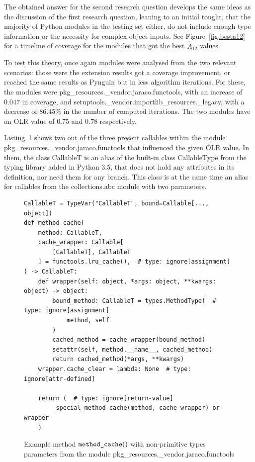 \documentclass[%
  chapterprefix=false,%
  open=right,%
  twoside=true,%
  paper=a4,%
  logofile={Figures/logo.png},%
  thesistype=master,%
  UKenglish,%
]{se2thesis}
\newcommand{\callable}[2][]{\(\text{\texttt{#2}}(#1)\)}
\begin{document}
The obtained answer for the second research question develops the same ideas as the discussion of the first research question, leaning to an initial tought, that the majority of Python modules in the testing set either, do not include enough type information or the necessity for complex object inputs. 
See Figure~\ref{fig:besta12} for a timeline of coverage for the modules that got the best \(\hat{A}_{12}\) values.

To test this theory, once again modules were analysed from the two relevant scenarios: those were the extension results got a coverage improvement, or reached the same results as Pynguin but in less algorithm iterations.
For these, the modules were pkg\_resources.\_vendor.jaraco.functools, with an increase of \(0.047\) in coverage, and setuptools.\_vendor.importlib\_resources.\_legacy, with a decrease of \(86.45\%\) in the number of computed iterations.
The two modules have an OLR value of \(0.75\) and \(0.78\) respectively.

Listing~\ref{lst:10} shows two out of the three present callables within the module pkg\_resources.\_vendor.jaraco.functools that influenced the given OLR value.
In them, the class CallableT is an alias of the built-in class CallableType from the typing library added in Python 3.5, that does not hold any attributes in its definition, nor need them for any branch.
This class is at the same time an alias for callables from the collections.abc module with two parameters. 

\begin{figure}
\begin{verbatim}
CallableT = TypeVar("CallableT", bound=Callable[..., object])
def method_cache(
    method: CallableT,
    cache_wrapper: Callable[
        [CallableT], CallableT
    ] = functools.lru_cache(),  # type: ignore[assignment]
) -> CallableT:
    def wrapper(self: object, *args: object, **kwargs: object) -> object:
        bound_method: CallableT = types.MethodType(  # type: ignore[assignment]
            method, self
        )
        cached_method = cache_wrapper(bound_method)
        setattr(self, method.__name__, cached_method)
        return cached_method(*args, **kwargs)
    wrapper.cache_clear = lambda: None  # type: ignore[attr-defined]

    return (  # type: ignore[return-value]
        _special_method_cache(method, cache_wrapper) or wrapper
    )
\end{verbatim}
\caption{Example method \callable[]{method\_cache} with non-primitive types parameters from the module pkg\_resources.\_vendor.jaraco.functools}\label{lst:10}
\end{figure}
\end{document}
